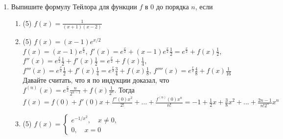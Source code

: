 \documentclass[a4paper]{article}
\begin{document}
\begin{enumerate}
    \item Выпишите формулу Тейлора для функции $f$ в $0$ до порядка $n$, если
    \begin{enumerate}
        \item (5) $f(x) = \frac{1}{(x+1)(x-2)}$
        \item (5) $f(x) = (x-1)e^{x/2}$\\
        $f(x) = (x-1)e^{\frac{x}{2}}$, $f'(x) = e^{\frac{x}{2}} + (x-1)e^{\frac{x}{2}}\frac{1}{2} = e^\frac{x}{2} + f(x)\frac{1}{2}$, $f''(x) = e^\frac{x}{2}\frac{1}{2} + f'(x)\frac{1}{2} = e^\frac{x}{2} + f(x)\frac{1}{4}$,\\
        $f'''(x) = e^\frac{x}{2}\frac{1}{2} + f'(x)\frac{1}{4} = e^\frac{x}{2}\frac{3}{4} + f(x)\frac{1}{8}$, $f''''(x) = e^\frac{x}{2}\frac{4}{8} + f(x)\frac{1}{16}$\\
        Давайте считать, что я по индукции доказал, что $f^{(n)}(x) = e^\frac{x}{2}\frac{n}{2^{{n-1}}} + f(x)\frac{1}{2^n}$.
        Тогда $f(x) = f(0) + f'(0)x + \frac{f''(0)x^2}{2!} + \ldots + \frac{f^{(n)}(0)x^n}{n!} = -1 + \frac{1}{2}x + \frac{3}{8}x^2 + \ldots + \frac{2n - 1}{n!2^n}x^n$
        \item (5) $f(x) = \begin{cases}e^{-1/x^2},\quad x\neq 0,\\ 0,\quad x=0\end{cases}$
    \end{enumerate}
    

\end{enumerate}
\end{document}
